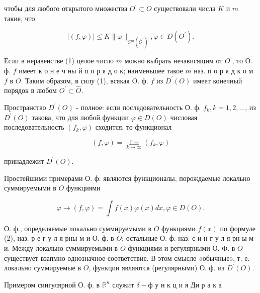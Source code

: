 \documentclass[10pt]{article}
\begin{document}
чтобы для любого открытого множества $O^{\prime} \subset O$ существовали числа $K$ и $m$ такие, что



\[

|(f, \varphi)| \leqslant K\|\varphi\|_{C^{m}\left(\bar{O}^{\prime}\right)}, \varphi \in D\left(O^{\prime}\right) .

\]



Если в неравенстве (1) целое число $m$ можно выбрать независящим от $O^{\prime}$, то О. ф. $f$ имеет к о н е ч ны й п о р я д о к; наименьшее такое $m$ наз. п о р я д к о м $f$ в $O$. Таким образом, в силу (1), всякая O. ф. $f$ из $D^{\prime}(O)$ имеет конечный порядок в любом $O^{\prime} \subset \hat{O}$.



Пространство $D^{\prime}(O)$ - полное: если последовательность О. ф. $f_{k}, k=1,2, \ldots$, из $D^{\prime}(O)$ такова, что для любой функции $\varphi \in D(O)$ числовая последовательность $\left(f_{k}, \varphi\right)$ сходится, то функционал



\[

(f, \varphi)=\lim _{k \rightarrow \infty}\left(f_{k}, \varphi\right)

\]



принадлежит $D^{\prime}(O)$.



Простейшими примерами О. ф. являются функционалы, порождаемые локально суммируемыми в $O$ функциями



\[

\varphi \rightarrow(f, \varphi)=\int f(x) \varphi(x) d x, \varphi \in D(O) .

\]



О. ф., определяемые локально суммируемыми в $O$ функциями $f(x)$ по формуле (2), наз. р е г у л я рны м и О. ф. в $O$; остальные О. ф. наз. с и н г у л я рн ы м и. Между локально суммируемыми в $O$ функциями и регулярными О. Ф. в $O$ существует взапмно однозначное соответствие. В этом смысле «обычные», т. е. локально суммируемые в $O$, функции являются (регулярными) О. ф. из $D^{\prime}(O)$.



Примером сингулярной О. ф. в $\mathbb{R}^{n}$ служит $\delta-ф$ у н к ц и я Ди р а к а
\end{document}
